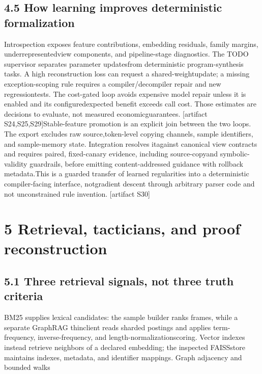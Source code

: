\subsection*{4.5  How learning improves deterministic formalization}
\noindent
Introspection exposes feature contributions, embedding residuals, family margins, underrepresented\linebreak[4]
view components, and pipeline-stage diagnostics. The TODO supervisor separates parameter updates\linebreak[4]
from deterministic program-synthesis tasks. A high reconstruction loss can request a shared-weight\linebreak[4]
update; a missing exception-scoping rule requires a compiler/decompiler repair and new regression\linebreak[4]
tests. The cost-gated loop avoids expensive model repair unless it is enabled and its configured\linebreak[4]
expected benefit exceeds call cost. Those estimates are decisions to evaluate, not measured economic\linebreak[4]
guarantees. [artifact S24,S25,S29]\linebreak[4]
Stable-feature promotion is an explicit join between the two loops. The export excludes raw source,\linebreak[4]
token-level copying channels, sample identifiers, and sample-memory state. Integration resolves it\linebreak[4]
against canonical view contracts and requires paired, fixed-canary evidence, including source-copy\linebreak[4]
and symbolic-validity guardrails, before emitting content-addressed guidance with rollback metadata.\linebreak[4]
This is a guarded transfer of learned regularities into a deterministic compiler-facing interface, not\linebreak[4]
gradient descent through arbitrary parser code and not unconstrained rule invention. [artifact S30]\par

\section*{5  Retrieval, tacticians, and proof reconstruction}
\subsection*{5.1  Three retrieval signals, not three truth criteria}
\noindent
BM25 supplies lexical candidates: the sample builder ranks frames, while a separate GraphRAG thin\linebreak[4]
client reads sharded postings and applies term-frequency, inverse-frequency, and length-normalization\linebreak[4]
scoring. Vector indexes instead retrieve neighbors of a declared embedding; the inspected FAISS\linebreak[4]
store maintains indexes, metadata, and identifier mappings. Graph adjacency and bounded walks\par

